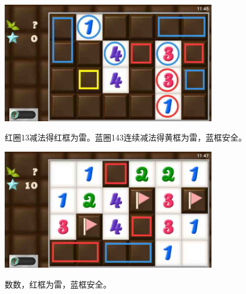 \subsection{} %
\begin{center}
    \includegraphics[width=0.7\textwidth]{puzzlelow/169-1.jpg}
\end{center}
红圈13减法得红框为雷。蓝圈143连续减法得黄框为雷，蓝框安全。
\begin{center}
    \includegraphics[width=0.7\textwidth]{puzzlelow/169-2.jpg}
\end{center}
数数，红框为雷，蓝框安全。

